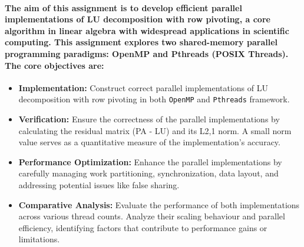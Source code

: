 \documentclass[12pt]{article}
\begin{document}
\paragraph{The aim of this assignment is to develop efficient parallel implementations of LU decomposition with row pivoting, a core algorithm in linear algebra with widespread applications in scientific computing. This assignment explores two shared-memory parallel programming paradigms: \textbf{OpenMP} and \textbf{Pthreads} (POSIX Threads). The core objectives are: }
\begin{itemize}
    \item \textbf{Implementation: }Construct correct parallel implementations of LU decomposition with row pivoting in both \verb|OpenMP| and \verb|Pthreads| framework.
    \item \textbf{Verification: }Ensure the correctness of the parallel implementations by calculating the residual matrix (PA - LU) and its L2,1 norm. A small norm value serves as a quantitative measure of the implementation's accuracy.
    \item \textbf{Performance Optimization:} Enhance the parallel implementations by carefully managing work partitioning, synchronization, data layout, and addressing potential issues like false sharing.
    \item \textbf{Comparative Analysis: }Evaluate the performance of both implementations across various thread counts. Analyze their scaling behaviour and parallel efficiency, identifying factors that contribute to performance gains or limitations.
\end{itemize}
\end{document}
